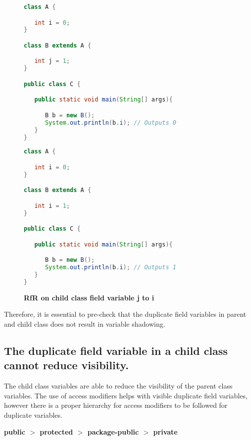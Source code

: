 \begin{figure}[th]
\centering
\begin{minipage}[t]{0.75\linewidth}
\begin{lstlisting}[language=java, basicstyle=\scriptsize\ttfamily,frame=single]
class A {

   int i = 0;
}

class B extends A {

   int j = 1; 
}

public class C {

   public static void main(String[] args){

      B b = new B();
      System.out.println(b.i); // Outputs 0
   }
}
\end{lstlisting}
\end{minipage}
\hfill
\begin{minipage}[t]{0.75\linewidth}
\begin{lstlisting}[language=java, basicstyle=\scriptsize\ttfamily,frame=single]
class A {

   int i = 0;
}

class B extends A {

   int i = 1; 
}

public class C {

   public static void main(String[] args){

      B b = new B();
      System.out.println(b.i); // Outputs 1
   }
}
\end{lstlisting}
\end{minipage}
\caption{\textbf{RfR on child class field variable j to i}}
\label{figure:classEx}
\end{figure}

Therefore, it is essential to pre-check that the duplicate field variables in parent and child class does not result in variable shadowing. 

\subsection{The duplicate field variable in a child class cannot reduce visibility.}

The child class variables are able to reduce the visibility of the parent class variables. The use of access modifiers helps with visible duplicate field variables, however there is a proper hierarchy for access modifiers to be followed for duplicate variables.

\textbf{public $>$ protected $>$ package-public $>$ private}

